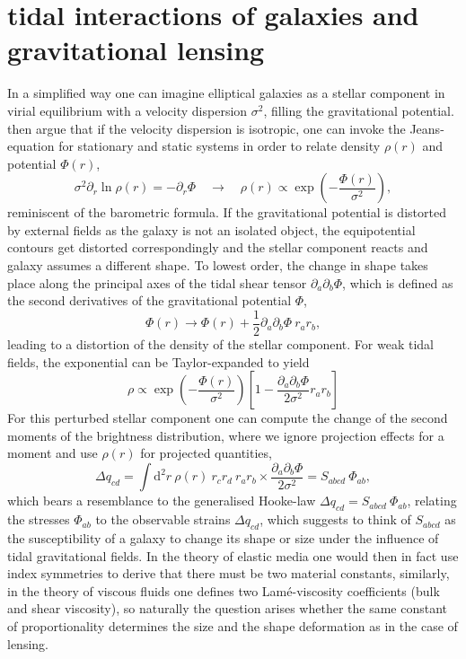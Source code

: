 \documentclass[a4paper,fleqn,usenatbib]{mnras}
\newcommand{\dd}{\mathrm{d}}
\begin{document}
\section{tidal interactions of galaxies and gravitational lensing}\label{sect_tidal}
In a simplified way one can imagine elliptical galaxies as a stellar component in virial equilibrium with a velocity dispersion $\sigma^2$, filling the gravitational potential. \citet{piras_mass_2018} then argue that if the velocity dispersion is isotropic, one can invoke the Jeans-equation for stationary and static systems in order to relate density $\rho(r)$ and potential $\Phi(r)$,
\begin{equation}
\sigma^2\partial_r\ln\rho(r) = -\partial_r\Phi
\quad\rightarrow\quad
\rho(r) \propto \exp\left(-\frac{\Phi(r)}{\sigma^2}\right),
\end{equation}
reminiscent of the barometric formula. If the gravitational potential is distorted by external fields as the galaxy is not an isolated object, the equipotential contours get distorted correspondingly and the stellar component reacts and galaxy assumes a different shape. To lowest order, the change in shape takes place along the principal axes of the tidal shear tensor $\partial_a\partial_b\Phi$, which is defined as the second derivatives of the gravitational potential $\Phi$,
\begin{equation}
\Phi(r) \rightarrow \Phi(r) + \frac{1}{2}\partial_a\partial_b\Phi\:r_a r_b,
\end{equation}
leading to a distortion of the density of the stellar component. For weak tidal fields, the exponential can be Taylor-expanded to yield
\begin{equation}
\rho \propto 
\exp\left(-\frac{\Phi(r)}{\sigma^2}\right)\left[1-\frac{\partial_a\partial_b\Phi}{2\sigma^2}r_a r_b\right]
\end{equation}
For this perturbed stellar component one can compute the change of the second moments of the brightness distribution, where we ignore projection effects for a moment and use $\rho(r)$ for projected quantities,
\begin{equation}
\Delta q_{cd} = 
\int\dd^2r\:\rho(r)\: r_c r_d\: r_a r_b\times\frac{\partial_a\partial_b\Phi}{2\sigma^2} = S_{abcd}\:\Phi_{ab},
\end{equation}
which bears a resemblance to the generalised Hooke-law $\Delta q_{cd} = S_{abcd}\:\Phi_{ab}$, relating the stresses $\Phi_{ab}$ to the observable strains $\Delta q_{cd}$, which suggests to think of $S_{abcd}$ as the susceptibility of a galaxy to change its shape or size under the influence of tidal gravitational fields. In the theory of elastic media one would then in fact use index symmetries to derive that there must be two material constants, similarly, in the theory of viscous fluids one defines two Lam{\'e}-viscosity coefficients (bulk and shear viscosity), so naturally the question arises whether the same constant of proportionality determines the size and the shape deformation as in the case of lensing.
\end{document}
